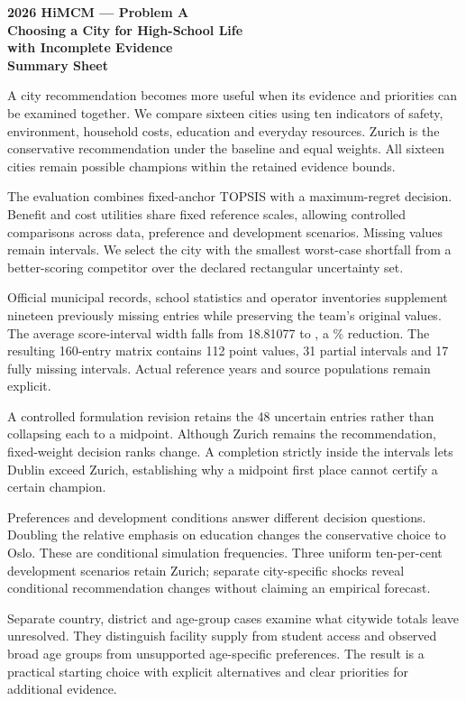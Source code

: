 \thispagestyle{fancy}
\begin{center}
\textbf{2026 HiMCM --- Problem A}\\[9pt]
{\Large\bfseries Choosing a City for High-School Life\\with Incomplete Evidence}\\[12pt]
\textbf{Summary Sheet}
\end{center}
A city recommendation becomes more useful when its evidence and priorities can
be examined together. We compare sixteen cities using ten indicators of safety,
environment, household costs, education and everyday resources. Zurich is the
conservative recommendation under the baseline and equal weights. All sixteen
cities remain possible champions within the retained evidence bounds.

The evaluation combines fixed-anchor TOPSIS with a maximum-regret decision.
Benefit and cost utilities share fixed reference scales, allowing controlled
comparisons across data, preference and development scenarios. Missing values
remain intervals. We select the city with the smallest worst-case shortfall from
a better-scoring competitor over the declared rectangular uncertainty set.

Official municipal records, school statistics and operator inventories supplement
nineteen previously missing entries while preserving the team's original values.
The average score-interval width falls from 18.81077 to \CurrentMeanWidth{}, a \TotalWidthReduction\%
reduction. The resulting 160-entry matrix contains 112 point values, 31 partial
intervals and 17 fully missing intervals. Actual reference years and source
populations remain explicit.

A controlled formulation revision retains the 48 uncertain entries rather
than collapsing each to a midpoint. Although Zurich remains the recommendation, \RevisionRankChanges{}
fixed-weight decision ranks change. A completion strictly inside the intervals
lets Dublin exceed Zurich, establishing why a midpoint first place cannot
certify a certain champion.

Preferences and development conditions answer different decision questions.
Doubling the relative emphasis on education changes the conservative choice to
Oslo. \SummaryWeightMC{} These are conditional simulation frequencies.
Three uniform ten-per-cent development scenarios retain Zurich; separate
city-specific shocks reveal conditional recommendation changes without claiming
an empirical forecast.

Separate country, district and age-group cases examine what citywide totals
leave unresolved. They distinguish facility supply from student access and
observed broad age groups from unsupported age-specific preferences. The result
is a practical starting choice with explicit alternatives and clear priorities
for additional evidence.

